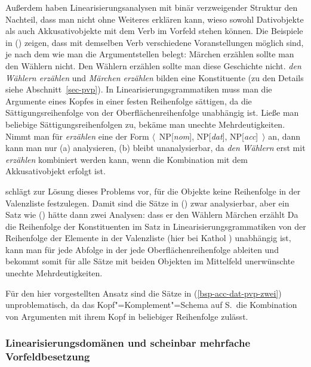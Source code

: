 %
Außerdem haben Linearisierungsanalysen mit binär verzweigender Struktur den Nachteil,
dass man nicht ohne Weiteres erklären kann,
wieso sowohl Dativobjekte als auch Akkusativobjekte mit dem Verb im Vorfeld stehen können.
Die Beispiele in () zeigen, dass mit demselben Verb verschiedene Voranstellungen möglich sind,
je nach dem wie man die Argumentstellen belegt:
\eal
\label{bsp-acc-dat-pvp-zwei}
\ex Märchen erzählen sollte man den Wählern nicht.
\ex Den Wählern erzählen sollte man diese Geschichte nicht.
\zl
\emph{den Wählern erzählen} und \emph{Märchen erzählen} bilden eine Konstituente (zu den Details
siehe Abschnitt~\ref{sec-pvp}). In Linearisierungsgrammatiken muss man die Argumente eines Kopfes
in einer festen Reihenfolge sättigen, da die Sättigungsreihenfolge von der Oberflächenreihenfolge unabhängig ist. Ließe
man beliebige Sättigungsreihenfolgen zu, bekäme man unechte Mehrdeutigkeiten.
Nimmt man für \emph{erzählen} eine \compsl der Form $\langle$~NP[\textit{nom}], NP[\textit{dat}],
NP[\textit{acc}]~$\rangle$ an, dann kann man nur (a) analysieren, (b) bleibt unanalysierbar,
da \emph{den Wählern} erst mit \emph{erzählen} kombiniert werden kann, wenn die Kombination
mit dem Akkusativobjekt erfolgt ist.

\citet[]{Kathol2000a} schlägt zur Lösung dieses Problems vor,
für die Objekte keine Reihenfolge in der Valenzliste festzulegen. Damit sind
die Sätze in () zwar analysierbar, aber ein Satz wie () hätte
dann zwei Analysen:
\ea
dass er den Wählern Märchen erzählt
\z
Da die Reihenfolge der Konstituenten im Satz in Linearisierungsgrammatiken
von der Reihenfolge der Elemente in der Valenzliste (hier \comps bei Kathol \subcat) unabhängig ist, kann man
für jede Abfolge in der \compsl jede Oberflächenreihenfolge ableiten und bekommt
somit für alle Sätze mit beiden Objekten im Mittelfeld unerwünschte unechte Mehrdeutigkeiten.

Für den hier vorgestellten Ansatz sind die Sätze in (\ref{bsp-acc-dat-pvp-zwei}) unproblematisch,
da das Kopf"=Komplement"=Schema auf S.\,\pageref{schema-Kopf-Komplementschema-prel2} die Kombination von Argumenten
mit ihrem Kopf in beliebiger Reihenfolge zulässt.
%
%


\subsubsection{Linearisierungsdomänen und scheinbar mehrfache Vorfeldbesetzung}
\label{sec-Wetta}

